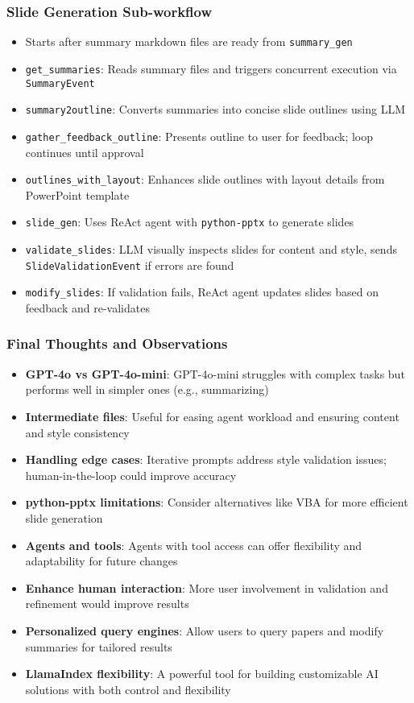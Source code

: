\begin{frame}[fragile]\frametitle{Slide Generation Sub-workflow}
  \begin{itemize}
    \item Starts after summary markdown files are ready from \texttt{summary\_gen}
    \item \texttt{get\_summaries}: Reads summary files and triggers concurrent execution via \texttt{SummaryEvent}
    \item \texttt{summary2outline}: Converts summaries into concise slide outlines using LLM
    \item \texttt{gather\_feedback\_outline}: Presents outline to user for feedback; loop continues until approval
    \item \texttt{outlines\_with\_layout}: Enhances slide outlines with layout details from PowerPoint template
    \item \texttt{slide\_gen}: Uses ReAct agent with \texttt{python-pptx} to generate slides
    \item \texttt{validate\_slides}: LLM visually inspects slides for content and style, sends \texttt{SlideValidationEvent} if errors are found
    \item \texttt{modify\_slides}: If validation fails, ReAct agent updates slides based on feedback and re-validates
  \end{itemize}
\end{frame}

\begin{frame}[fragile]\frametitle{Final Thoughts and Observations}
  \begin{itemize}
    \item \textbf{GPT-4o vs GPT-4o-mini}: GPT-4o-mini struggles with complex tasks but performs well in simpler ones (e.g., summarizing)
    \item \textbf{Intermediate files}: Useful for easing agent workload and ensuring content and style consistency
    \item \textbf{Handling edge cases}: Iterative prompts address style validation issues; human-in-the-loop could improve accuracy
    \item \textbf{python-pptx limitations}: Consider alternatives like VBA for more efficient slide generation
    \item \textbf{Agents and tools}: Agents with tool access can offer flexibility and adaptability for future changes
    \item \textbf{Enhance human interaction}: More user involvement in validation and refinement would improve results
    \item \textbf{Personalized query engines}: Allow users to query papers and modify summaries for tailored results
    \item \textbf{LlamaIndex flexibility}: A powerful tool for building customizable AI solutions with both control and flexibility
  \end{itemize}
\end{frame}


